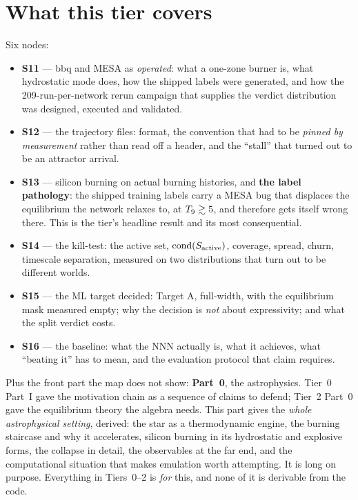 \section*{What this tier covers}
\label{sec:covers}

Six nodes:
\begin{itemize}
\item \textbf{S11} --- bbq and MESA as \emph{operated}: what a one-zone burner
  is, what hydrostatic mode does, how the shipped labels were generated, and how
  the 209-run-per-network rerun campaign that supplies the verdict distribution
  was designed, executed and validated.
\item \textbf{S12} --- the trajectory files: format, the 
  convention that had to be \emph{pinned by measurement} rather than read off a
  header, and the ``stall'' that turned out to be an attractor arrival.
\item \textbf{S13} --- silicon burning on actual burning histories, and
  \textbf{the label pathology}: the shipped training labels carry a MESA bug
  that displaces the equilibrium the network relaxes to, at $T_{9} \gtrsim 5$, and
  therefore gets \Ye{} itself wrong there. This is the tier's headline result
  and its most consequential.
\item \textbf{S14} --- the kill-test: the active set, $\operatorname{cond}(S_{\mathrm{active}})$, coverage,
  spread, churn, timescale separation, measured on two distributions that turn
  out to be different worlds.
\item \textbf{S15} --- the ML target decided: Target A, full-width, with the
  equilibrium mask measured empty; why the decision is \emph{not} about
  expressivity; and what the split verdict costs.
\item \textbf{S16} --- the baseline: what the NNN actually is, what it
  achieves, what ``beating it'' has to mean, and the evaluation protocol that
  claim requires.
\end{itemize}

Plus the front part the map does not show: \textbf{Part~0}, the astrophysics.
Tier~0 Part~I gave the motivation chain as a sequence of claims to defend;
Tier~2 Part~0 gave the equilibrium theory the algebra needs. This part gives the
\emph{whole astrophysical setting}, derived: the star as a thermodynamic engine,
the burning staircase and why it accelerates, silicon burning in its hydrostatic
and explosive forms, the collapse in detail, the observables at the far end, and
the computational situation that makes emulation worth attempting. It is long on
purpose. Everything in Tiers~0--2 is \emph{for} this, and none of it is derivable
from the code.

